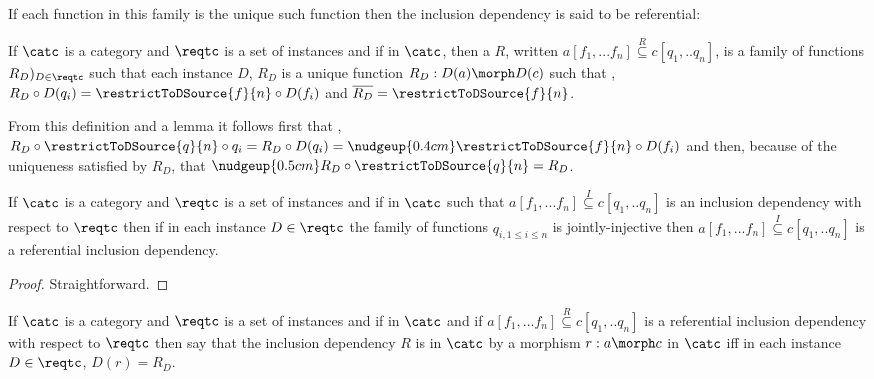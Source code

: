 If each function in this family is the unique such function then the inclusion dependency is said to be referential:


\begin{definition}
If $\catc$ is a  category and $\reqtc$ is a set of instances 
and if
\fnsourceqnsource
in $\catc$, then a  $R$, written $a[f_1,...f_n] \overset{R}{\subseteq} c[q_1,..q_n]$, is a family of functions $R_D)_{D \in \reqtc}$
such that each instance $D$, 
$R_D$ is a unique function $R_D : D(a) \morph D(c)$ such that
\foreachi,
    $R_D \circ D(q_i) = \restrictToDSource{f}{n} \circ D(f_i)$
and $\overline{R_D}=\restrictToDSource{f}{n}$.
\end{definition}

From this definition and a lemma  
it follows 
first that \foreachi, 
$R_D \circ \restrictToDSource{q}{n} \circ q_i = R_D \circ D(q_i) = \nudgeup{0.4cm}\restrictToDSource{f}{n} \circ D(f_i)$ 
and then, because of the uniqueness satisfied by $R_D$, that
$\nudgeup{0.5cm}R_D \circ \restrictToDSource{q}{n} = R_D$.

\begin{lemma}
If $\catc$ is a category and $\reqtc$ is a set of instances and if
\fnsourceqnsource
in $\catc$
such that $a[f_1,...f_n] \overset{I}{\subseteq} c[q_1,..q_n]$ is an inclusion dependency with respect  to $\reqtc$ then if in each instance $D \in \reqtc$ the family of functions
$q_{i, 1 \leq i \leq n}$ is jointly-injective then $a[f_1,...f_n] \overset{I}{\subseteq} c[q_1,..q_n]$ is a referential inclusion dependency.
\end{lemma}
\begin{proof}
Straightforward.
\end{proof}

\begin{definition}
If $\catc$ is a category and $\reqtc$ is a set of instances and if
\fnsourceqnsource
in $\catc$ and if $a[f_1,...f_n] \overset{R}{\subseteq} c[q_1,..q_n]$ is a referential inclusion dependency
with respect  to $\reqtc$ then say that the inclusion dependency $R$ is  in $\catc$ by a morphism $r:a \morph c$ in $\catc$
iff in each instance $D \in \reqtc$, $D(r) = R_D$. 
\end{definition}

